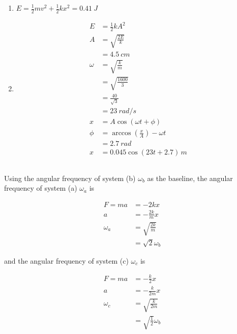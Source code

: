 \documentclass{article}
\begin{document}
\begin{enumerate}
  \item $E = \frac{1}{2} m v^2 + \frac{1}{2} k x^2 = \qty{0.41}{J}$

  \item

        \begin{align*}
          E      & = \frac{1}{2} k A^2                             \\
          A      & = \sqrt{\frac{2 E}{k}}                          \\
                 & = \qty{4.5}{cm}                                 \\
          \omega & = \sqrt{\frac{k}{m}}                            \\
                 & = \sqrt{\frac{1600}{3}}                         \\
                 & = \frac{40}{\sqrt{3}}                           \\
                 & = \qty{23}{rad/s}                               \\
          x      & = A \cos (\omega t + \phi)                      \\
          \phi   & = \arccos \left( \frac{x}{A} \right) - \omega t \\
                 & = \qty{2.7}{rad}                                \\
          x      & = 0.045 \cos (23 t + 2.7) \,\unit{m}
        \end{align*}
\end{enumerate}

\subsection{}

Using the angular frequency of system (b) $\omega_b$ as the baseline, the angular frequency of system (a) $\omega_a$ is

\begin{align*}
  F = m a  & = -2 k x               \\
  a        & = -\frac{2 k}{m} x     \\
  \omega_a & = \sqrt{\frac{2 k}{m}} \\
           & = \sqrt{2} \omega_b
\end{align*}

and the angular frequency of system (c) $\omega_c$ is

\begin{align*}
  F = m a  & = -\frac{k}{2} x              \\
  a        & = -\frac{k}{2 m} x            \\
  \omega_c & = \sqrt{\frac{k}{2 m}}        \\
           & = \sqrt{\frac{1}{2}} \omega_b
\end{align*}
\end{document}
